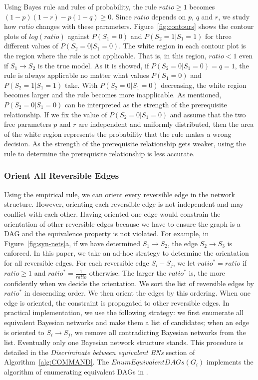 \documentclass{edm_template}
\begin{document}
Using Bayes rule and rules of probability, the rule $ratio\ge 1$ becomes $(1-p)(1-r)-p(1-q)\ge 0$.
Since $ratio$ depends on $p$, $q$ and $r$, we study how $ratio$ changes with these parameters.
Figure~\ref{fig:contours} shows the contour plots of $log(ratio)$ against $P(S_1=0)$ and $P(S_2=1|S_1=1)$ for three different values of $P(S_2=0|S_1=0)$.
The white region in each contour plot is the region where the rule is not applicable. 
That is, in this region, $ratio<1$ even if $S_1\rightarrow S_2$ is the true model.
As it is showed, if $P(S_2=0|S_1=0)=q=1$, 
the rule is always applicable no matter what values $P(S_1=0)$ and $P(S_2=1|S_1=1)$ take.
With $P(S_2=0|S_1=0)$ decreasing, the white region becomes larger and the rule becomes more inapplicable.
As mentioned, $P(S_2=0|S_1=0)$ can be interpreted as the strength of the prerequisite relationship. 
If we fix the value of $P(S_2=0|S_1=0)$ and assume that the two free parameters $p$ and $r$ are independent and uniformly distributed, then the area of the white region represents the probability that the rule makes a wrong decision.
As the strength of the prerequisite relationship  gets weaker, using the rule to determine the prerequisite relationship is less accurate.

\subsubsection{Orient All Reversible Edges}
Using the empirical rule, we can orient every reversible edge in the network structure. 
However, orienting each reversible edge is not independent and may conflict with each other.
Having oriented one edge would constrain the orientation of other reversible edges because we have to ensure the graph is a DAG and the equivalence property is not violated.
For example, in Figure~\ref{fig:syn-nets}a, if we have determined $S_1\rightarrow S_2$, the edge $S_2\rightarrow S_3$ is enforced.
In this paper, we take an ad-hoc strategy to determine the orientation for all reversible edges. 
For each reversible edge $S_i-S_j$, we let $ratio^*=ratio$ if $ratio \ge 1$ and $ratio^*=\frac{1}{ratio}$ otherwise. 
The larger the $ratio^*$ is, the more confidently when we decide the orientation.
We sort the list of reversible edges by $ratio^*$ in descending order. We then orient the edges by this ordering.
When one edge is oriented, the constraint is propagated to other reversible edges. In practical implementation, we use the following strategy: 
we first enumerate all equivalent Bayesian networks and make them a list of candidates; 
when an edge is oriented to $S_i\rightarrow S_j$, we remove all contradicting Bayesian networks from the list.
Eventually only one Bayesian network structure stands. This procedure is detailed in the \emph{Discriminate between equivalent BNs} section of Algorithm~\ref{alg:COMMAND}.  
The $EnumEquivalentDAGs(G_i)$ implements the algorithm of enumerating equivalent DAGs in \cite{chen2014finding}.
\end{document}
